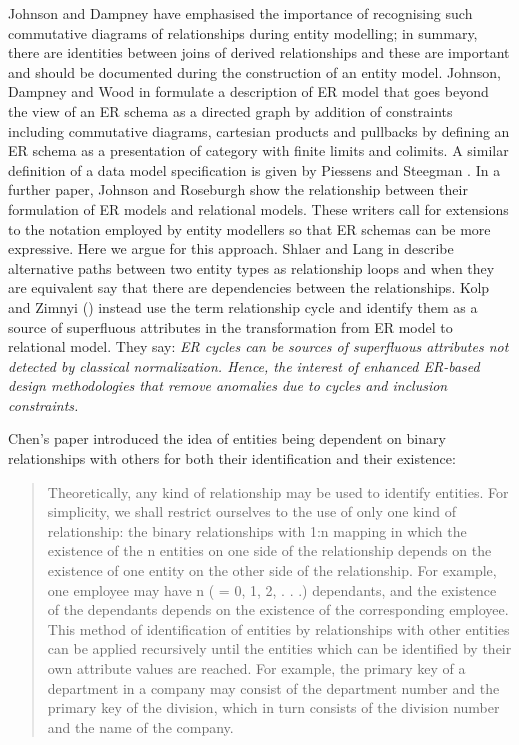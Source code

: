 \documentclass[10pt,a4paper]{article}
\begin{document}
Johnson and Dampney \cite{Johnson93} have emphasised the 
importance of recognising such commutative diagrams of 
relationships during entity modelling; 
in summary, there are identities between joins of derived 
relationships and these are important
and should be documented during the construction of an entity model. 
Johnson, Dampney and Wood in \cite{Johnson2002ERA} formulate a description of 
ER model that goes beyond the view of an ER schema as a directed graph 
by addition of constraints including commutative diagrams, cartesian products and 
pullbacks by defining an ER schema as a presentation of category with 
finite limits and colimits.  
A similar definition of a data model specification is given by Piessens and Steegman \cite{piessens1995}.
In a further paper, Johnson and Roseburgh \cite{Johnson2002REL} show the 
relationship between their formulation of ER models and relational models. 
These writers call for extensions to the notation employed by entity modellers so that ER schemas can be more expressive. Here we argue for this approach.  
Shlaer and Lang in \cite{Shlaer96} describe alternative paths between two entity types as relationship loops and when they are equivalent say that there are dependencies between the relationships.  
Kolp and Zimnyi (\cite{Kolp1995}) instead use the term relationship cycle and identify them as a source of 
superfluous attributes in the transformation from ER model to relational model. They say: \textit{ER cycles can be sources of 
superfluous attributes not detected by classical normalization. Hence, the interest of enhanced ER-based design methodologies that remove anomalies due to cycles and inclusion constraints.}


Chen's paper introduced the idea of entities being dependent on binary relationships 
with others for both their identification and their existence:

\begin{quote}
Theoretically, any kind of relationship may be used to identify entities. For
simplicity, we shall restrict ourselves to the use of only one kind of relationship:
the binary relationships with 1:n mapping in which the existence of the n entities
on one side of the relationship depends on the existence of one entity on the other
side of the relationship. For example, one employee may have n ( = 0, 1, 2, . . .)
dependants, and the existence of the dependants depends on the existence of the
corresponding employee.
This method of identification of entities by relationships with other entities can
be applied recursively until the entities which can be identified by their own attribute
values are reached. For example, the primary key of a department in a
company may consist of the department number and the primary key of the
division, which in turn consists of the division number and the name of the company.
\end{quote}
\end{document}
